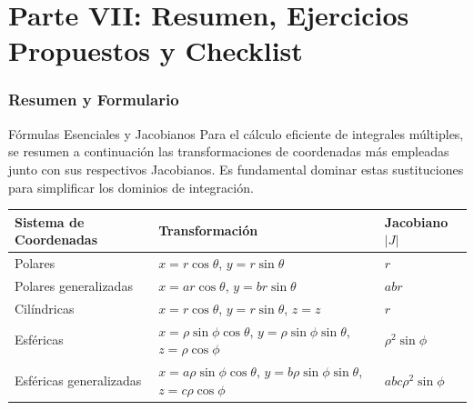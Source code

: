\documentclass[11pt,a4paper]{article}
\begin{document}
\part*{Parte VII: Resumen, Ejercicios Propuestos y Checklist}

\section{Resumen y Formulario}

\begin{observacionbox}{Fórmulas Esenciales y Jacobianos}
Para el cálculo eficiente de integrales múltiples, se resumen a continuación las transformaciones de coordenadas más empleadas junto con sus respectivos Jacobianos. Es fundamental dominar estas sustituciones para simplificar los dominios de integración.

\begin{center}
\renewcommand{\arraystretch}{1.5}
\begin{tabular}{|l|l|l|}
\hline
\textbf{Sistema de Coordenadas} & \textbf{Transformación} & \textbf{Jacobiano} $|J|$ \\ \hline
Polares & $x = r \cos \theta$, $y = r \sin \theta$ & $r$ \\ \hline
Polares generalizadas & $x = a r \cos \theta$, $y = b r \sin \theta$ & $abr$ \\ \hline
Cilíndricas & $x = r \cos \theta$, $y = r \sin \theta$, $z = z$ & $r$ \\ \hline
Esféricas & $x = \rho \sin \phi \cos \theta$, $y = \rho \sin \phi \sin \theta$, $z = \rho \cos \phi$ & $\rho^2 \sin \phi$ \\ \hline
Esféricas generalizadas & $x = a \rho \sin \phi \cos \theta$, $y = b \rho \sin \phi \sin \theta$, $z = c \rho \cos \phi$ & $abc \rho^2 \sin \phi$ \\ \hline
\end{tabular}
\end{center}
\end{observacionbox}
\end{document}
